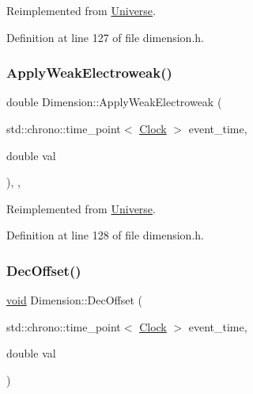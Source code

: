Reimplemented from \mbox{\hyperlink{class_universe_a6d1226b3adec3c42a833afdbb6a65a92}{Universe}}.



Definition at line 127 of file dimension.\+h.

\mbox{\label{class_dimension_abf490cabd486afa660f17940ed0d17e6}} 
\subsubsection{\texorpdfstring{Apply\+Weak\+Electroweak()}{ApplyWeakElectroweak()}}
{\footnotesize\ttfamily double Dimension\+::\+Apply\+Weak\+Electroweak (\begin{DoxyParamCaption}\item[{std\+::chrono\+::time\+\_\+point$<$ \mbox{\hyperlink{universe_8h_a0ef8d951d1ca5ab3cfaf7ab4c7a6fd80}{Clock}} $>$}]{event\+\_\+time,  }\item[{double}]{val }\end{DoxyParamCaption})\hspace{0.3cm}{\ttfamily [inline]}, {\ttfamily [final]}, {\ttfamily [virtual]}}



Reimplemented from \mbox{\hyperlink{class_universe_a46a906baabb63e5d31f8b48ea1fae52e}{Universe}}.



Definition at line 128 of file dimension.\+h.

\mbox{\label{class_dimension_a2017e62d4b3caf31f4f1b6b5cf59a798}} 
\subsubsection{\texorpdfstring{Dec\+Offset()}{DecOffset()}}
{\footnotesize\ttfamily \mbox{\hyperlink{glad_8h_a950fc91edb4504f62f1c577bf4727c29}{void}} Dimension\+::\+Dec\+Offset (\begin{DoxyParamCaption}\item[{std\+::chrono\+::time\+\_\+point$<$ \mbox{\hyperlink{universe_8h_a0ef8d951d1ca5ab3cfaf7ab4c7a6fd80}{Clock}} $>$}]{event\+\_\+time,  }\item[{double}]{val }\end{DoxyParamCaption})}



